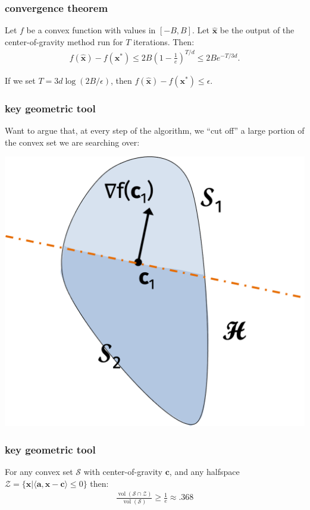 \documentclass[compress]{beamer}
\newcommand{\bv}[1]{\mathbf{#1}}
\DeclareMathOperator{\vol}{vol}
\begin{document}
\begin{frame}[t]
	\frametitle{convergence theorem}
	\begin{theorem}
		Let $f$ be a convex function with values in $[-B,B]$.
		Let $\hat{\bv{x}}$ be the output of the center-of-gravity method run for $T$ iterations. Then:
		\begin{align*}
			f(\hat{\bv{x}}) - f(\bv{x}^*) \leq 2B \left(1-\frac{1}{e}\right)^{T/d} \leq 2B e^{-T/3d}.
		\end{align*}
	\end{theorem}
	If we set $T = 3d\log(2B/\epsilon)$, then $f(\hat{\bv{x}}) - f(\bv{x}^*) \leq \epsilon$. 
\end{frame}

\begin{frame}[t]
	\frametitle{key geometric tool}
	Want to argue that, at every step of the algorithm, we ``cut off'' a large portion of the convex set we are searching over:
	
	\begin{center}
		\includegraphics[width=.5\textwidth]{cog3.png}
	\end{center}
\end{frame}

\begin{frame}[t]
	\frametitle{key geometric tool}
	\begin{theorem}
		For any convex set $\mathcal{S}$ with center-of-gravity $\bv{c}$, and any halfspace 	$\mathcal{Z} = \{\bv{x} \big\vert \langle \bv{a}, \bv{x}-\bv{c}\rangle \leq 0\}$ then:
		\begin{align*}
			\frac{\vol(\mathcal{S} \cap \mathcal{Z})}{\vol(\mathcal{S})}\geq \frac{1}{e} \approx .368
		\end{align*}
	\end{theorem}

\end{frame}
\end{document}
